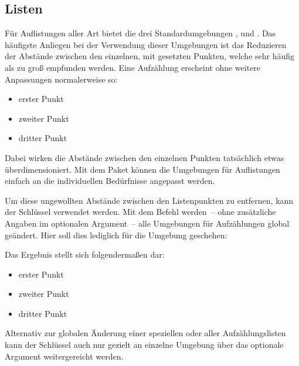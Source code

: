 \documentclass[%
  english,ngerman,%
  cdgeometry=no,DIV=12,automark,%
]{tudscrartcl}
\begin{document}
\subsection{Listen}
\label{sec:lists}
Für Auflistungen aller Art bietet  die drei Standardumgebungen 
,  und . 
Das häufigste Anliegen bei der Verwendung dieser Umgebungen ist das Reduzieren 
der Abstände zwischen den einzelnen, mit  gesetzten Punkten, welche 
sehr häufig als zu groß empfunden werden. Eine Aufzählung erscheint ohne 
weitere Anpassungen normalerweise so:
%
\begin{Hint*}
\begin{itemize}
\item erster Punkt
\item zweiter Punkt
\item dritter Punkt
\end{itemize}
\end{Hint*}
%
Dabei wirken die Abstände zwischen den einzelnen Punkten tatsächlich etwas 
überdimensioniert. Mit dem Paket  können die Umgebungen für 
Auflistungen einfach an die individuellen Bedürfnisse angepasst werden. 
%
\begin{Preamble}
\usepackage{enumitem}
\end{Preamble}
Um diese ungewollten Abstände zwischen den Listenpunkten zu entfernen, kann der 
Schlüssel  verwendet werden. Mit dem Befehl  
werden~-- ohne zusätzliche Angaben im optionalen Argument~-- alle Umgebungen 
für Aufzählungen global geändert. Hier soll dies lediglich für die Umgebung 
 geschehen:
\begin{Preamble*}

\end{Preamble*}
%
Das Ergebnis stellt sich folgendermaßen dar:
%
\begin{Hint*}
\begin{itemize}
\item erster Punkt
\item zweiter Punkt
\item dritter Punkt
\end{itemize}

\end{Hint*}
%
Alternativ zur globalen Änderung einer speziellen oder aller Aufzählungslisten 
kann der Schlüssel  auch nur gezielt an einzelne Umgebung 
über das optionale Argument weitergereicht werden.
\end{document}
